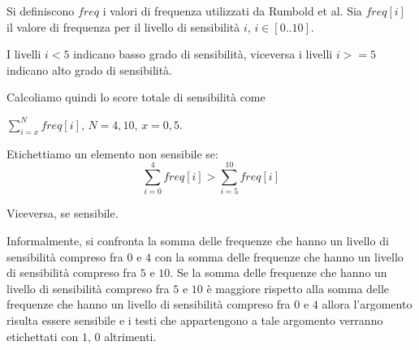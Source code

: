 Si definiscono $freq$ i valori di frequenza utilizzati da Rumbold et al. Sia $freq[i]$ il valore di frequenza per il livello di sensibilità $i$, $i\in[0..10]$.

I livelli $i<5$ indicano basso grado di sensibilità, viceversa i livelli $i>=5$ indicano alto grado di sensibilità. 

Calcoliamo quindi lo score totale di sensibilità come

$\sum^{N}_{i=x}freq[i]$, $N=4,10$, $x=0,5$. 

Etichettiamo un elemento non sensibile se:
\begin{equation}
\sum^{4}_{i=0}freq[i] > \sum^{10}_{i=5}freq[i]
\end{equation}

Viceversa, se sensibile.

Informalmente, si confronta la somma delle frequenze che hanno un livello di sensibilità compreso fra $0$ e $4$ con la somma delle frequenze che hanno un livello di sensibilità compreso fra $5$ e $10$. Se la somma delle frequenze che hanno un livello di sensibilità compreso fra $5$ e $10$ è maggiore rispetto alla somma delle frequenze che hanno un livello di sensibilità compreso fra $0$ e $4$ allora l'argomento risulta essere sensibile e i testi che appartengono a tale argomento verranno etichettati con $1$, $0$ altrimenti.

